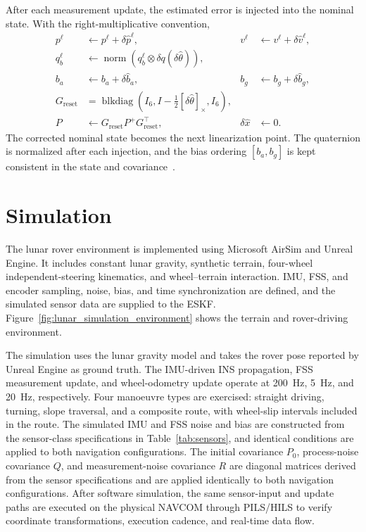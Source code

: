 \documentclass[]{IAC_style}
\begin{document}
After each measurement update, the estimated error is injected into the nominal state. With the right-multiplicative convention,
\begin{equation}
\tag{29}\label{eq:29}
\begin{aligned}
p^\ell&\leftarrow p^\ell+\delta\hat p^\ell,
&v^\ell&\leftarrow v^\ell+\delta\hat v^\ell,\\
q_b^\ell&\leftarrow
  \operatorname{norm}\!\left(q_b^\ell\otimes\delta q(\delta\hat\theta)\right),\\
b_a&\leftarrow b_a+\delta\hat b_a,
&b_g&\leftarrow b_g+\delta\hat b_g,\\
G_{\mathrm{reset}}
  &=\operatorname{blkdiag}\!\left(
    I_6,I-\tfrac12[\delta\hat\theta]_\times,I_6\right),\\
P&\leftarrow G_{\mathrm{reset}}P^+G_{\mathrm{reset}}^\top,
&\delta\hat x&\leftarrow0.
\end{aligned}
\end{equation}
The corrected nominal state becomes the next linearization point. The quaternion is normalized after each injection, and the bias ordering $[b_a,b_g]$ is kept consistent in the state and covariance~\cite{sola2017quaternion}.

\section{Simulation}

The lunar rover environment is implemented using Microsoft AirSim and Unreal Engine. It includes constant lunar gravity, synthetic terrain, four-wheel independent-steering kinematics, and wheel--terrain interaction. IMU, FSS, and encoder sampling, noise, bias, and time synchronization are defined, and the simulated sensor data are supplied to the ESKF. Figure~\ref{fig:lunar_simulation_environment} shows the terrain and rover-driving environment.

The simulation uses the lunar gravity model and takes the rover pose reported by Unreal Engine as ground truth. The IMU-driven INS propagation, FSS measurement update, and wheel-odometry update operate at 200~Hz, 5~Hz, and 20~Hz, respectively. Four manoeuvre types are exercised: straight driving, turning, slope traversal, and a composite route, with wheel-slip intervals included in the route. The simulated IMU and FSS noise and bias are constructed from the sensor-class specifications in Table~\ref{tab:sensors}, and identical conditions are applied to both navigation configurations. The initial covariance $P_0$, process-noise covariance $Q$, and measurement-noise covariance $R$ are diagonal matrices derived from the sensor specifications and are applied identically to both navigation configurations. After software simulation, the same sensor-input and update paths are executed on the physical NAVCOM through PILS/HILS to verify coordinate transformations, execution cadence, and real-time data flow.
\end{document}
